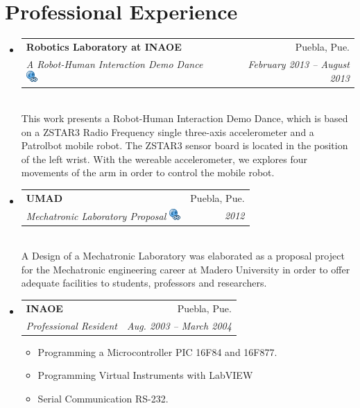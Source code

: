 \documentclass[10pt]{article}
\makeatletter
\newcommand{\resitem}[1]{\item #1 \vspace{-2pt}}
\newcommand{\ressubheading}[4]{
\begin{tabular*}{6.5in}{l@{\extracolsep{\fill}}r}
		\textbf{#1} & #2 \\
		\textit{#3} & \textit{#4} \\
\end{tabular*}\vspace{-6pt}}
\makeatother
\begin{document}
        \section*{Professional Experience}
        	\begin{itemize}
		\item 
			\ressubheading{Robotics Laboratory at INAOE}{Puebla, Pue.}{A Robot-Human Interaction Demo Dance
			\href{https://sites.google.com/site/perezxochicale/projects/demodance}{\includegraphics[scale=.3]{link_url_icon}}}{February 2013 -- August 2013}
				{ \footnotesize  \\[10pt]
				This work presents a Robot-Human Interaction Demo Dance,  
				which is based on a ZSTAR3 Radio Frequency single three-axis accelerometer and a Patrolbot mobile robot. 
				The ZSTAR3 sensor board is located in the position of the left wrist. With the wereable accelerometer, 
				we explores four movements of the arm in order to control the mobile robot.
				}
		\item
		\ressubheading{UMAD}{Puebla, Pue.}{ Mechatronic Laboratory Proposal \href{https://sites.google.com/site/perezxochicaleprojects/mechatronicslaboratorydesign}
{\includegraphics[scale=.3]{link_url_icon}}}{2012}
				{ \footnotesize \\[10pt]
A Design of a Mechatronic Laboratory was elaborated as a proposal project for the Mechatronic engineering career at Madero University in order to offer adequate facilities to students, professors and researchers.}
		\item 
			\ressubheading{INAOE}{Puebla, Pue.}{Professional Resident}{Aug. 2003 -- March 2004}
				{ \footnotesize
				\begin{itemize}
					\resitem{Programming a Microcontroller PIC 16F84 and 16F877.}
					\resitem{Programming Virtual Instruments with LabVIEW}	    
					\resitem{Serial Communication RS-232.}
				\end{itemize}
				}
	\end{itemize}  %

    
    
\end{document}
